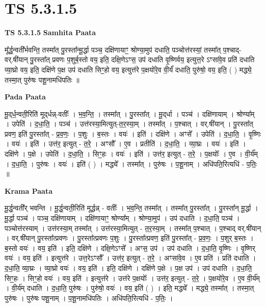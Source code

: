 \documentclass[17pt]{extarticle}
\begin{document}
\section{ TS 5.3.1.5 }

\textbf{TS 5.3.1.5 } \newline
\textbf{Samhita Paata} \newline

मू᳚र्द्ध॒न्वती᳚र्भवन्ति॒ तस्मा᳚त् पु॒रस्ता᳚न्मू॒र्द्धा पञ्च॒ दक्षि॑णायाꣳ॒॒ श्रोण्या॒मुप॑ दधाति॒ पञ्चोत्त॑रस्यां॒ तस्मा᳚त् प॒श्चाद्-वर्.षी॑यान् पु॒रस्ता᳚त् प्रवणः प॒शुर्ब॒स्तो वय॒ इति॒ दक्षि॒णेऽꣳस॒ उप॑ दधाति वृ॒ष्णिर्वय॒ इत्युत्त॒रे ऽꣳसा॑वे॒व प्रति॑ दधाति व्या॒घ्रो वय॒ इति॒ दक्षि॑णे प॒क्ष उप॑ दधाति सिꣳ॒॒हो वय॒ इत्युत्त॑रे प॒क्षयो॑रे॒व वी॒र्यं॑ दधाति॒ पुरु॑षो॒ वय॒ इति॒ ( ) मद्ध्ये॒ तस्मा॒त् पुरु॑षः पशू॒नामधि॑पतिः ॥ \newline

\textbf{Pada Paata} \newline

मू॒द्‌र्ध॒न्वती॒रिति॑ मूद्‌र्धन्न्-वतीः᳚ । भ॒व॒न्ति॒ । तस्मा᳚त् । पु॒रस्ता᳚त् । मू॒द्‌र्धा । पञ्च॑ । दक्षि॑णायाम् । श्रोण्या᳚म् । उपेति॑ । द॒धा॒ति॒ । पञ्च॑ । उत्त॑रस्या॒मित्युत्-त॒र॒स्या॒म् । तस्मा᳚त् । प॒श्चात् । वर्.षी॑यान् । पु॒रस्ता᳚त् प्रवण॒ इति॑ पु॒रस्ता᳚त् - प्र॒व॒णः॒ । प॒शुः । ब॒स्तः । वयः॑ । इति॑ । दक्षि॑णे । अꣳसे᳚ । उपेति॑ । द॒धा॒ति॒ । वृ॒ष्णिः । वयः॑ । इति॑ । उत्त॑र॒ इत्युत् - त॒रे॒ । अꣳसौ᳚ । ए॒व । प्रतीति॑ । द॒धा॒ति॒ । व्या॒घ्रः । वयः॑ । इति॑ । दक्षि॑णे । प॒क्षे । उपेति॑ । द॒धा॒ति॒ । सिꣳ॒॒हः । वयः॑ । इति॑ । उत्त॑र॒ इत्युत् - त॒रे॒ । प॒क्षयोः᳚ । ए॒व । वी॒र्य᳚म् । द॒धा॒ति॒ । पुरु॑षः । वयः॑ । इति॑ ( ) । मद्ध्ये᳚ । तस्मा᳚त् । पुरु॑षः । प॒शू॒नाम् । अधि॑पति॒रित्यधि॑ - प॒तिः॒ ॥  \newline


\textbf{Krama Paata} \newline

मू॒र्द्ध॒न्वती᳚र् भवन्ति । मू॒र्द्ध॒न्वती॒रिति॑ मूर्द्धन्न् - वतीः᳚ । भ॒व॒न्ति॒ तस्मा᳚त् । तस्मा᳚त् पु॒रस्ता᳚त् । पु॒रस्ता᳚न् मू॒र्द्धा । मू॒र्द्धा पञ्च॑ । पञ्च॒ दक्षि॑णायाम् । दक्षि॑णायाꣳ॒॒ श्रोण्या᳚म् । श्रोण्या॒मुप॑ । उप॑ दधाति । द॒धा॒ति॒ पञ्च॑ । पञ्चोत्त॑रस्याम् । उत्त॑रस्या॒म् तस्मा᳚त् । उत्त॑रस्या॒मित्युत् - त॒र॒स्या॒म् । तस्मा᳚त् प॒श्चात् । प॒श्चाद् वर्.षी॑यान् । वर्.षी॑यान् पु॒रस्ता᳚त्प्रवणः । पु॒रस्ता᳚त्प्रवणः प॒शुः । पु॒रस्ता᳚त्प्रवण॒ इति॑ पु॒रस्ता᳚त् - प्र॒व॒णः॒ । प॒शुर् ब॒स्तः । ब॒स्तो वयः॑ । वय॒ इति॑ । इति॒ दक्षि॑णे । दक्षि॒णेऽꣳसे᳚ । अꣳस॒ उप॑ । उप॑ दधाति । द॒धा॒ति॒ वृ॒ष्णिः । वृ॒ष्णिर् वयः॑ । वय॒ इति॑ । इत्युत्त॑रे । उत्त॒रेऽꣳसौ᳚ । उत्त॑र॒ इत्युत् - त॒रे॒ । अꣳसा॑वे॒व । ए॒व प्रति॑ । प्रति॑ दधाति । द॒धा॒ति॒ व्या॒घ्रः । व्या॒घ्रो वयः॑ । वय॒ इति॑ । इति॒ दक्षि॑णे । दक्षि॑णे प॒क्षे । प॒क्ष उप॑ । उप॑ दधाति । द॒धा॒ति॒ सिꣳ॒॒हः । सिꣳ॒॒हो वयः॑ । वय॒ इति॑ । इत्युत्त॑रे । उत्त॑रे प॒क्षयोः᳚ । उत्त॑र॒ इत्युत् - त॒रे॒ । प॒क्षयो॑रे॒व । ए॒व वी॒र्य᳚म् । वी॒र्य॑म् दधाति । द॒धा॒ति॒ पुरु॑षः । पुरु॑षो॒ वयः॑ । वय॒ इति॑ ( ) । इति॒ मद्ध्ये᳚ । मद्ध्ये॒ तस्मा᳚त् । तस्मा॒त् पुरु॑षः । पुरु॑षः पशू॒नाम् । प॒शू॒नामधि॑पतिः । अधि॑पति॒रित्यधि॑ - प॒तिः॒ । \newline
\end{document}
